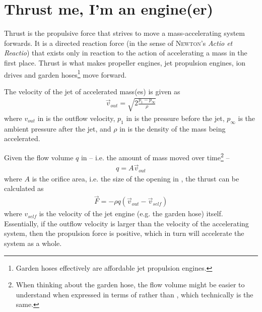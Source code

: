 
\section{Thrust me, I'm an engine(er)}

Thrust %
is the propulsive force that strives to move a mass-accelerating system forwards. 
It is a directed reaction force (in the sense of \textsc{Newton}'s \textit{Actio et Reactio})
that exists only in reaction to the action of accelerating a mass in the first place.
Thrust is what makes propeller engines, jet propulsion engines, ion drives and garden 
hoses\footnote{Garden hoses effectively are affordable jet propulsion engines.} move forward.


The velocity of the jet of accelerated mass(es) is given as
%
\begin{align}
\vec{v}_{out} = \sqrt{2\frac{p_1 - p_\infty}{\rho}} \label{eq:outflow_velocity}
\end{align}
%
where $v_{out}$ in \withunit{\metre\per\second} is the outflow velocity,
$p_1$ in \withunit{\newton\per\square\metre} is the pressure before the jet,
$p_\infty$ is the ambient pressure after the jet, and
$\rho$ in \withunit{\kilo\gram\per\cubic\metre} is the density of the mass being accelerated.

Given the flow volume $q$ in \withunit{\cubic\metre\per\second} -- i.e. the amount
of mass moved over time\footnote{When
thinking about the garden hose, the flow volume might be easier to understand when expressed in terms of  rather than , which technically is the same.} --
%
\begin{align}
q = A\vec{v}_{out} \label{eq:flowvolume}
\end{align}
%
where $A$ is the orifice area, i.e. the size of the opening in \withunit{\square\metre}, the thrust can be calculated as
%
\begin{align}
\vec{F} = -\rho q \left( \vec{v}_{out} - \vec{v}_{self} \right) \label{eq:thrust}
\end{align}
%
where $v_{self}$ is the velocity of the jet engine (e.g. the garden hose) itself. Essentially, if the outflow velocity is larger than the velocity
of the accelerating system, then the propulsion force is positive, which in
turn will accelerate the system as a whole.

